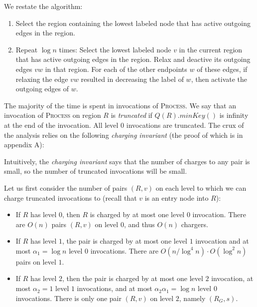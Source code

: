 \documentclass[12pt]{article}
\begin{document}
We restate the algorithm:
\begin{enumerate}
\item Select the region containing the lowest labeled node that has active outgoing edges in the region.
\item Repeat $\log n$ times: Select the lowest labeled node $v$ in the current region that has active outgoing edges in the region. Relax and deactive its outgoing edges $vw$ in that region. For each of the other endpoints $w$ of these edges, if relaxing the edge $vw$ resulted in decreasing the label of $w$, then activate the outgoing edges of $w$.
\end{enumerate}

The majority of the time is spent in invocations of \textsc{Process}. We say that an invocation of \textsc{Process} on region $R$ is \emph{truncated} if $Q(R).minKey()$ is infinity at the end of the invocation. All level $0$ invocations are truncated. The crux of the analysis relies on the following \emph{charging invariant} (the proof of which is in appendix A):

\noindent{}

Intuitively, the \emph{charging invariant} says that the number of charges to any pair is small, so the number of truncated invocations will be small.

 Let us first consider the number of pairs $(R,v)$ on each level to which we can charge truncated invocations to (recall that $v$ is an entry node into $R$):
\begin{itemize}
\item If $R$ has level $0$, then $R$ is charged by at most one level $0$ invocation. There are $O(n)$ pairs $(R,v)$ on level $0$, and thus $O(n)$ chargers.
\item If $R$ has level $1$, the pair is charged by at most one level $1$ invocation and at most $\alpha_1 = \log n$ level $0$ invocations. There are $O(n/\log^4n)\cdot O(\log^2 n)$ pairs on level $1$.
\item If $R$ has level $2$, then the pair is charged by at most one level $2$ invocation, at most $\alpha_2 = 1$ level $1$ invocations, and at most $\alpha_2\alpha_1 = \log n$ level $0$ invocations. There is only one pair $(R,v)$ on level $2$, namely $(R_G,s)$.
\end{itemize}
\end{document}
